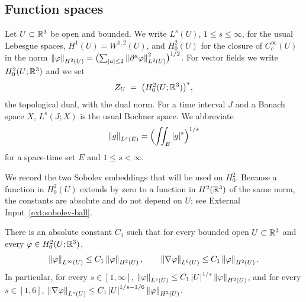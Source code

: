 \documentclass[11pt,reqno]{amsart}
\begin{document}
\subsection{Function spaces}\label{ss:spaces}

Let $U\subset\mathbb{R}^{3}$ be open and bounded. We write $L^{s}(U)$, $1\le s\le\infty$,
for the usual Lebesgue spaces, $H^{1}(U)=W^{1,2}(U)$, and $H^{2}_{0}(U)$ for the
closure of $C_{c}^{\infty}(U)$ in the norm
$\left\lVert \varphi \right\rVert_{H^{2}(U)}=\bigl(\sum_{\left\lvert a \right\rvert\le2}\left\lVert \partial^{a}\varphi \right\rVert_{L^{2}(U)}^{2}\bigr)^{1/2}$.
For vector fields we write $H^{2}_{0}(U;\mathbb{R}^{3})$ and we set
\begin{equation}\label{eq:Z-space}
  Z_{U}\;=\;\bigl(H^{2}_{0}(U;\mathbb{R}^{3})\bigr)^{*},
\end{equation}
the topological dual, with the dual norm. For a time interval $J$ and a Banach
space $X$, $L^{s}(J;X)$ is the usual Bochner space. We abbreviate
\[
  \left\lVert g \right\rVert_{L^{s}(E)}=\Bigl(\iint_{E}\left\lvert g \right\rvert^{s}\Bigr)^{1/s}
\]
for a space-time set $E$ and $1\le s<\infty$.

We record the two Sobolev embeddings that will be used on $H^{2}_{0}$. Because a
function in $H^{2}_{0}(U)$ extends by zero to a function in $H^{2}(\mathbb{R}^{3})$ of
the same norm, the constants are absolute and do not depend on $U$; see
External Input~\ref{ext:sobolev-ball}.

\begin{lemma}\label{lem:H2-embeddings}
There is an absolute constant $C_{1}$ such that for every bounded open
$U\subset\mathbb{R}^{3}$ and every $\varphi\in H^{2}_{0}(U;\mathbb{R}^{3})$,
\begin{equation}\label{eq:H2-emb}
  \left\lVert \varphi \right\rVert_{L^{\infty}(U)}\le C_{1}\left\lVert \varphi \right\rVert_{H^{2}(U)},
  \qquad
  \left\lVert \nabla\varphi \right\rVert_{L^{6}(U)}\le C_{1}\left\lVert \varphi \right\rVert_{H^{2}(U)} .
\end{equation}
In particular, for every $s\in[1,\infty]$,
$\left\lVert \varphi \right\rVert_{L^{s}(U)}\le C_{1}\left\lvert U \right\rvert^{1/s}\left\lVert \varphi \right\rVert_{H^{2}(U)}$,
and for every $s\in[1,6]$,
$\left\lVert \nabla\varphi \right\rVert_{L^{s}(U)}\le C_{1}\left\lvert U \right\rvert^{1/s-1/6}\left\lVert \varphi \right\rVert_{H^{2}(U)}$.
\end{lemma}
\end{document}
